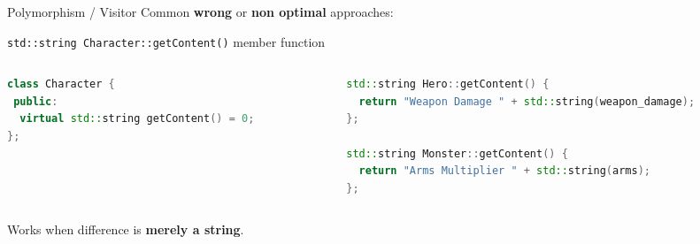 \documentclass[11pt]{beamer}
\renewcommand{\emph}[1]{\textbf{#1}}
\begin{document}
\begin{frame}[fragile]{Polymorphism / Visitor}
 Common \emph{wrong} or \emph{non optimal} approaches:
 
 \begin{center}
  \texttt{std::string Character::getContent()} member function
 \end{center}
 
 \begin{columns}
  \begin{column}{0.45\textwidth}
   \begin{lstlisting}[language=C++]
class Character {
 public:
  virtual std::string getContent() = 0;
};
\end{lstlisting}
  \end{column}
  \begin{column}{0.55\textwidth}
   \begin{lstlisting}[language=C++]
std::string Hero::getContent() {
  return "Weapon Damage " + std::string(weapon_damage);
};

std::string Monster::getContent() {
  return "Arms Multiplier " + std::string(arms);
};
\end{lstlisting}
  \end{column}
 \end{columns}
 Works when difference is \emph{merely a string}.
\end{frame}
\end{document}
